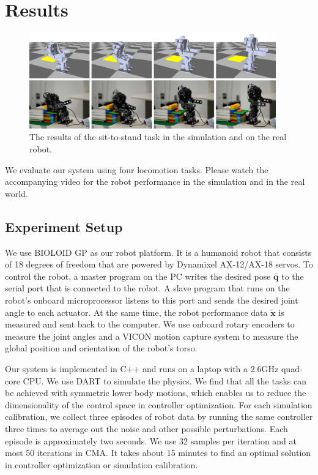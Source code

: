 \section{Results}

\begin{figure}[!t]
  \centering
  \includegraphics[width=0.95\textwidth]{figures/sit2Stand}
  \caption{The results of the sit-to-stand task in the simulation and on the real robot.}
  \vspace{-0.1in}
  \label{fig:sit2Stand}
\end{figure}

We evaluate our system using four locomotion tasks. Please watch the accompanying video for the robot performance in the simulation and in the real world.

\subsection{Experiment Setup}

We use BIOLOID GP as our robot platform. It is a humanoid robot that consists of 18 degrees of freedom that are powered by Dynamixel AX-12/AX-18 servos. To control the robot, a master program on the PC writes the desired pose $\bar{\mathbf{q}}$ to the serial port that is connected to the robot. A slave program that runs on the robot's onboard microprocessor listens to this port and sends the desired joint angle to each actuator. At the same time, the robot performance data $\tilde{\mathbf{x}}$ is measured and sent back to the computer. We use onboard rotary encoders to measure the joint angles and a VICON motion capture system to measure the global position and orientation of the robot's torso.

Our system is implemented in C++ and runs on a laptop with a 2.6GHz quad-core CPU. We use DART to simulate the physics. We find that all the tasks can be achieved with symmetric lower body motions, which enables us to reduce the dimensionality of the control space in controller optimization. For each simulation calibration, we collect three episodes of robot data by running the same controller three times to average out the noise and other possible perturbations. Each episode is approximately two seconds. We use 32 samples per iteration and at most 50 iterations in CMA. It takes about 15 minutes to find an optimal solution in controller optimization or simulation calibration.

